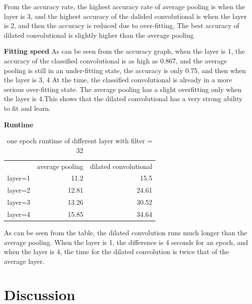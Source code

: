 \documentclass{article}
\begin{document}
From the accuracy rate, the highest accuracy rate of average pooling is when the layer is 3, and the highest accuracy of the dalided convolutional is when the layer is 2, and then the accuracy is reduced due to over-fitting. The best accuracy of dilated convolutional is slightly higher than the average pooling


\textbf{Fitting speed}
As can be seen from the accuracy graph, when the layer is 1, the accuracy of the classified convolutional is as high as 0.867, and the average pooling is still in an under-fitting state, the accuracy is only 0.75, and then when the layer is 3, 4 At the time, the classified convolutional is already in a more serious over-fitting state. The average pooling has a slight overfitting only when the layer is 4.This shows that the dilated convolutional has a very strong ability to fit and learn.

\textbf{Runtime}

\begin{table}[htbp]
  \centering
  \caption{one epoch runtime of different layer with filter = 32}
    \begin{tabular}{lrr}
          & \multicolumn{1}{l}{average pooling} & \multicolumn{1}{l}{dilated convolutional} \\
    layer=1 & 11.2   & 15.5 \\
    layer=2 & 12.81 & 24.61 \\
    layer=3 & 13.26 & 30.52 \\
    layer=4 & 15.85 & 34.64 \\
    \end{tabular}%
  \label{tab:addlabel}%
\end{table}%

As can be seen from the table, the dilated convolution runs much longer than the average pooling. When the layer is 1, the difference is 4 seconds for an epoch, and when the layer is 4, the time for the dilated convolution is twice that of the average layer.

\section{Discussion}
\end{document}
